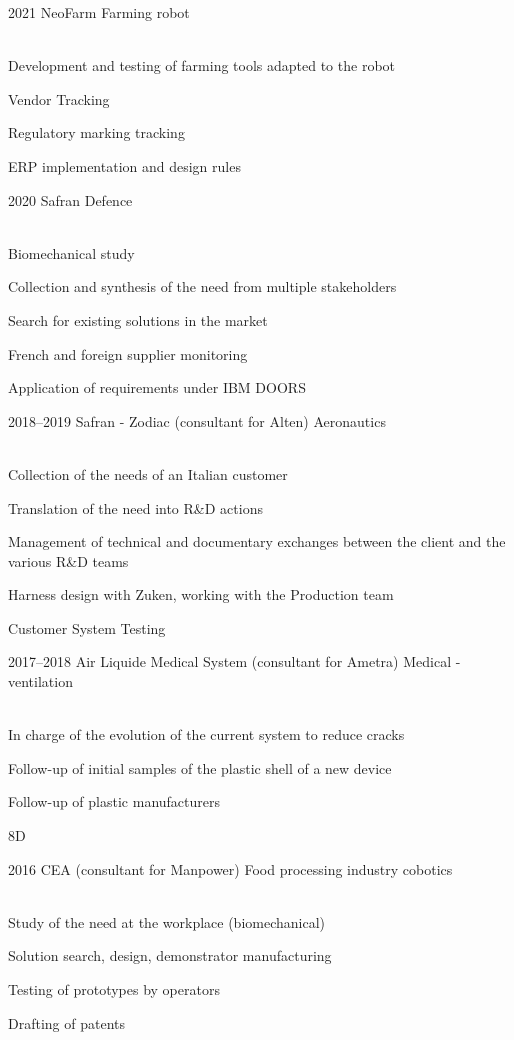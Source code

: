 \documentclass{cv-style}     %
\begin{document}
\begin{entrylist}
\entry
  {2021}
  {NeoFarm}
  {Farming robot}
  {\\
  Development and testing of farming tools adapted to the robot

  Vendor Tracking

  Regulatory marking tracking

  ERP implementation and design rules
   }
 
\entry
  {2020}
  {Safran}
  {Defence}
  {\\
  Biomechanical study

  Collection and synthesis of the need from multiple stakeholders

  Search for existing solutions in the market

  French and foreign supplier monitoring

  Application of requirements under IBM DOORS
  }
\entry
  {2018--2019}
  {Safran - Zodiac (consultant for Alten)}
  {Aeronautics}
  {\\
  Collection of the needs of an Italian customer

  Translation of the need into R\&D actions

  Management of technical and documentary exchanges between the client and the various R\&D teams

  Harness design with Zuken, working with the Production team

  Customer System Testing
 
  }
\entry
 {2017--2018}
 {Air Liquide Medical System (consultant for Ametra)}
 {Medical - ventilation}
 {\\
 In charge of the evolution of the current system to reduce cracks

 Follow-up of initial samples of the plastic shell of a new device

 Follow-up of plastic manufacturers

 8D
 }
\entry
 {2016}
 {CEA (consultant for Manpower)}
 {Food processing industry cobotics}
 {\\
 Study of the need at the workplace (biomechanical)

 Solution search, design, demonstrator manufacturing

 Testing of prototypes by operators

 Drafting of patents
 }

\end{entrylist}
\end{document}
